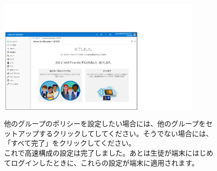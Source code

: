 \begin{figure}[h]
    \begin{minipage}{0.6\textwidth}
        \vspace{-1.5cm}
        \includegraphics[width=10cm]{figures/Setup-Intune-15.png}
    \end{minipage}
    \begin{minipage}{0.4\textwidth}
        他のグループのポリシーを設定したい場合には、他のグループをセットアップするクリックしてしてください。そうでない場合には、「すべて完了」をクリックしてください。\\
        これで高速構成の設定は完了しました。あとは生徒が端末にはじめてログインしたときに、これらの設定が端末に適用されます。
    \end{minipage}
\end{figure}